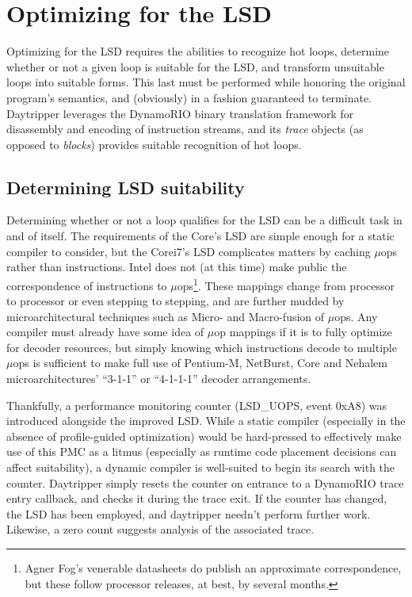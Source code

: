 \documentclass[]{sigplanconf}
\begin{document}
\section{Optimizing for the LSD}
Optimizing for the LSD requires the abilities to recognize hot loops, determine
whether or not a given loop is suitable for the LSD, and transform unsuitable
loops into suitable forms. This last must be performed while honoring the
original program's semantics, and (obviously) in a fashion guaranteed to
terminate. Daytripper leverages the DynamoRIO binary translation framework
for disassembly and encoding of instruction streams, and its \textit{trace}
objects (as opposed to \textit{blocks}) provides suitable recognition of hot
loops.

\subsection{Determining LSD suitability}
Determining whether or not a loop qualifies for the LSD can be a difficult task
in and of itself. The requirements of the Core's LSD are simple
enough for a static compiler to consider, but the Core\texttrademark i7's LSD
complicates matters by caching $\mu$ops rather than instructions. Intel does
not (at this time) make public the correspondence of instructions to $\mu$ops\footnote{Agner Fog's venerable datasheets \cite{agnerfog} do publish an approximate correspondence, but these follow processor releases, at best, by several months.}. These 
mappings change from processor to processor or even stepping to stepping, and
are further mudded by microarchitectural techniques such as Micro- and Macro-fusion
of $\mu$ops. Any compiler must already have some idea of $\mu$op mappings
if it is to fully optimize for decoder resources, but simply knowing which
instructions decode to multiple $\mu$ops is sufficient to make full use of
Pentium-M, NetBurst, Core and Nehalem microarchitectures' ``3-1-1'' or ``4-1-1-1''
decoder arrangements.

Thankfully, a performance monitoring counter (LSD\_UOPS, event 0xA8) was
introduced alongside the improved LSD. While a static compiler (especially in
the absence of profile-guided optimization) would be hard-pressed to
effectively make use of this PMC as a litmus (especially as runtime code
placement decisions can affect suitability), a dynamic compiler is well-suited
to begin its search with the counter. Daytripper simply resets the counter on
entrance to a DynamoRIO trace entry callback, and checks it during the trace
exit. If the counter has changed, the LSD has been employed, and daytripper
needn't perform further work. Likewise, a zero count suggests analysis of the
associated trace.
\end{document}
